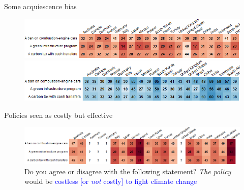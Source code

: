 \begin{frame}{Some acquiescence bias}%
	\begin{figure}[h!]
	\centering
	\caption{%
	Do you agree or disagree with the following statement? \textit{The policy} would have a \textcolor{blue}{\textbf{positive} effect on the French economy and employment}.}
	\includegraphics[width=\textwidth]{../figures/country_comparison/policies_positive_effect_positive_countries.png}
	\vspace{-.1cm}
	\centering %
	\caption{%
	Do you agree or disagree with the following statement? \textit{The policy} would have a \textcolor{blue}{\textbf{negative} effect on the French economy and employment}.}
	\includegraphics[width=\textwidth]{../figures/country_comparison/policies_negative_effect_positive_countries.png}
	\caption{}
	\end{figure}
\end{frame}


\begin{frame}{Policies seen as costly but effective}%
	
	\begin{figure}[h!]
	\vspace{-.1cm}
	\centering
	\caption{%
Do you agree or disagree with the following statement? \textit{The policy} would be \textcolor{blue}{costless [or \textit{not} costly] to fight climate change}} %
	\includegraphics[width=\textwidth]{../figures/country_comparison/policies_costless_costly_positive_countries.png}
	\end{figure}
\end{frame}
	
